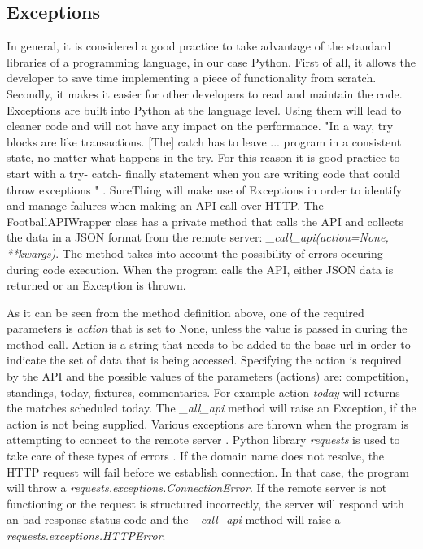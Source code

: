 \subsection{Exceptions}
\label{subsec:exceptions}
In general, it is considered a good practice to take advantage of the standard libraries of a programming language, in our case Python. First of all, it allows the developer to save time implementing a piece of functionality from scratch. Secondly, it makes it easier for other developers to read and maintain the code. Exceptions are built into Python at the language level. Using them will lead to cleaner code and will not have any impact on the performance. "In a way, try blocks are like transactions. [The] catch has to leave ... program in a consistent state, no matter what happens in the try. For this reason it is good practice to start with a try- catch- finally statement when you are writing code that could throw exceptions " \citet{book:martin2011robert}.
SureThing will make use of Exceptions in order to identify and manage failures when making an API call over HTTP. The FootballAPIWrapper class has a private method that calls the API and collects the data in a JSON format from the remote server: \emph{\_call\_api(action=None, **kwargs)}. The method takes into account the possibility of errors occuring during code execution. When the program calls the API, either JSON data is returned or an Exception is thrown.

As it can be seen from the method definition above, one of the required parameters is \emph{action} that is set to None, unless the value is passed in during the method call. Action is a string that needs to be added to the base url in order to indicate the set of data that is being accessed. Specifying the action is required by the API and the possible values of the parameters (actions) are: competition, standings, today, fixtures, commentaries. For example action \emph{today} will returns the matches scheduled today. The \emph{\_all\_api} method will raise an Exception, if the action is not being supplied. Various exceptions are thrown when the program is attempting to connect to the remote server \citep{article:httpRequestsExceptions}. Python library \emph{requests} is used to take care of these types of errors \citep{documentation:PythonRequests}. If the domain name does not resolve, the HTTP request will fail before we establish connection. In that case, the program will throw a \emph{requests.exceptions.ConnectionError}. If the remote server is not functioning or the request is structured incorrectly, the server will respond with an bad response status code and the \emph{\_call\_api} method will raise a \emph{requests.exceptions.HTTPError}.

